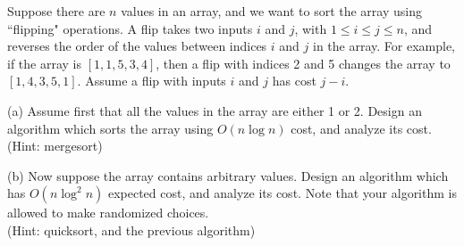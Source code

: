 \problem{}
Suppose there are $n$ values in an array, and we want to sort the array using ``flipping" operations.  A flip takes two inputs $i$ and $j$, with $1 \leq i \leq j \leq n$, and reverses the order of the values between indices $i$ and $j$ in the array.  For example, if the array is $[1,1,5,3,4]$, then a flip with indices 2 and 5 changes the array to $[1,4,3,5,1]$.  Assume a flip with inputs $i$ and $j$ has cost $j-i$.  

\hspace*{\fill}

\noindent (a) Assume first that all the values in the array are either 1 or 2.  Design an algorithm which sorts the array using $O(n \log n)$ cost, and analyze its cost.  \\
(Hint: mergesort)

\hspace*{\fill}

\noindent (b) Now suppose the array contains arbitrary values.   Design an algorithm which has $O(n \log^2 n)$ expected cost, and analyze its cost.  Note that your algorithm is allowed to make randomized choices. \\
(Hint: quicksort, and the previous algorithm)












\newpage